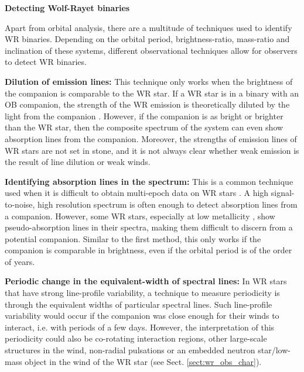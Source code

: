 \textbf{Detecting Wolf-Rayet binaries}\label{sect:detection_methods}

Apart from orbital analysis, there are a multitude of techniques used to identify WR binaries. Depending on the orbital period, brightness-ratio, mass-ratio and inclination of these systems, different observational techniques allow for observers to detect WR binaries.

\textbf{Dilution of emission lines:} This technique only works when the brightness of the companion is comparable to the WR star. If a WR star is in a binary with an OB companion, the strength of the WR emission is theoretically diluted by the light from the companion \citep{1968aSmith,1989ContiMassey,2007Crowther}. However, if the companion is as bright or brighter than the WR star, then the composite spectrum of the system can even show absorption lines from the companion. Moreover, the strengths of emission lines of WR stars are not set in stone, and it is not always clear whether weak emission is the result of line dilution or weak winds.

\textbf{Identifying absorption lines in the spectrum:} This is a common technique used when it is difficult to obtain multi-epoch data on WR stars \citep[e.g.,][]{1989ContiMassey}. A high signal-to-noise, high resolution spectrum is often enough to detect absorption lines from a companion. However, some WR stars, especially at low metallicity \citep[e.g.,][]{hainich_wolf-rayet_2015}, show pseudo-absorption lines in their spectra, making them difficult to discern from a potential companion. Similar to the first method, this only works if the companion is comparable in brightness, even if the orbital period is of the order of years.

\textbf{Periodic change in the equivalent-width of spectral lines:} In WR stars that have strong line-profile variability, a technique to measure periodicity is through the equivalent widths of particular spectral lines. Such line-profile variability would occur if the companion was close enough for their winds to interact, i.e. with periods of a few days. However, the interpretation of this periodicity could also be co-rotating interaction regions, other large-scale structures in the wind, non-radial pulsations or an embedded neutron star/low-mass object in the wind of the WR star (see Sect. \ref{sect:wr_obs_char}).

